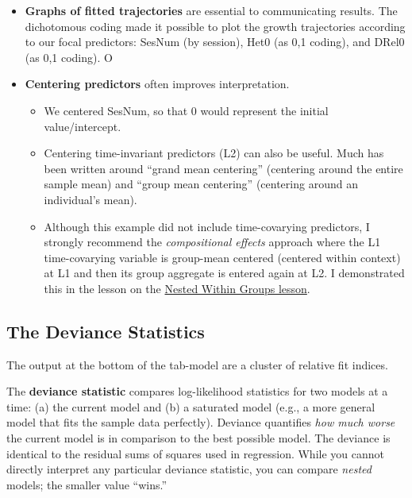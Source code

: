 \documentclass[
  11pt,
]{book}
\providecommand{\tightlist}{%
  \setlength{\itemsep}{0pt}\setlength{\parskip}{0pt}}
\begin{document}
\begin{itemize}
\item
  \textbf{Graphs of fitted trajectories} are essential to communicating results. The dichotomous coding made it possible to plot the growth trajectories according to our focal predictors: SesNum (by session), Het0 (as 0,1 coding), and DRel0 (as 0,1 coding). O
\item
  \textbf{Centering predictors} often improves interpretation.

  \begin{itemize}
  \tightlist
  \item
    We centered SesNum, so that 0 would represent the initial value/intercept.
  \item
    Centering time-invariant predictors (L2) can also be useful. Much has been written around ``grand mean centering'' (centering around the entire sample mean) and ``group mean centering'' (centering around an individual's mean).\\
  \item
    Although this example did not include time-covarying predictors, I strongly recommend the \emph{compositional effects} \citep{enders_centering_2007} approach where the L1 time-covarying variable is group-mean centered (centered within context) at L1 and then its group aggregate is entered again at L2. I demonstrated this in the lesson on the \protect\hyperlink{wGroups}{Nested Within Groups lesson}.
  \end{itemize}
\end{itemize}

\hypertarget{the-deviance-statistics}{%
\subsection{The Deviance Statistics}\label{the-deviance-statistics}}

The output at the bottom of the tab-model are a cluster of relative fit indices.

The \textbf{deviance statistic} compares log-likelihood statistics for two models at a time: (a) the current model and (b) a saturated model (e.g., a more general model that fits the sample data perfectly). Deviance quantifies \emph{how much worse} the current model is in comparison to the best possible model. The deviance is identical to the residual sums of squares used in regression. While you cannot directly interpret any particular deviance statistic, you can compare \emph{nested} models; the smaller value ``wins.''
\end{document}
